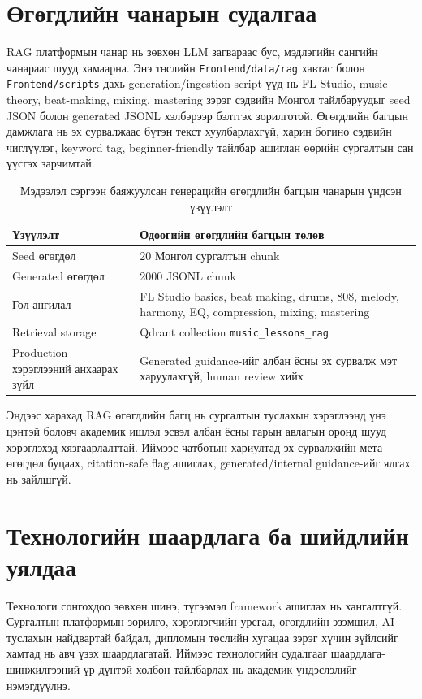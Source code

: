 \section{Өгөгдлийн чанарын судалгаа}
RAG платформын чанар нь зөвхөн LLM загвараас бус, мэдлэгийн сангийн чанараас шууд хамаарна. Энэ төслийн \texttt{Frontend/data/rag} хавтас болон \texttt{Frontend/scripts} дахь generation/ingestion script-үүд нь FL Studio, music theory, beat-making, mixing, mastering зэрэг сэдвийн Монгол тайлбаруудыг seed JSON болон generated JSONL хэлбэрээр бэлтгэх зорилготой. Өгөгдлийн багцын дамжлага нь эх сурвалжаас бүтэн текст хуулбарлахгүй, харин богино сэдвийн чиглүүлэг, keyword tag, beginner-friendly тайлбар ашиглан өөрийн сургалтын сан үүсгэх зарчимтай.

\begin{table}[htbp]
  \centering
  \begin{tabular}{|p{}|p{}|}
    \hline
    \textbf{Үзүүлэлт} & \textbf{Одоогийн өгөгдлийн багцын төлөв} \\ \hline
    Seed өгөгдөл & 20 Монгол сургалтын chunk \\ \hline
    Generated өгөгдөл & 2000 JSONL chunk \\ \hline
    Гол ангилал & FL Studio basics, beat making, drums, 808, melody, harmony, EQ, compression, mixing, mastering \\ \hline
    Retrieval storage & Qdrant collection \texttt{music\_lessons\_rag} \\ \hline
    Production хэрэглээний анхаарах зүйл & Generated guidance-ийг албан ёсны эх сурвалж мэт харуулахгүй, human review хийх \\ \hline
  \end{tabular}
  \caption{Мэдээлэл сэргээн баяжуулсан генерацийн өгөгдлийн багцын чанарын үндсэн үзүүлэлт}
  \label{tab:rag-dataset-summary}
\end{table}

Эндээс харахад RAG өгөгдлийн багц нь сургалтын туслахын хэрэглээнд үнэ цэнтэй боловч академик ишлэл эсвэл албан ёсны гарын авлагын оронд шууд хэрэглэхэд хязгаарлалттай. Иймээс чатботын хариултад эх сурвалжийн мета өгөгдөл буцаах, citation-safe flag ашиглах, generated/internal guidance-ийг ялгах нь зайлшгүй.

\section{Технологийн шаардлага ба шийдлийн уялдаа}
Технологи сонгохдоо зөвхөн шинэ, түгээмэл framework ашиглах нь хангалтгүй. Сургалтын платформын зорилго, хэрэглэгчийн урсгал, өгөгдлийн эзэмшил, AI туслахын найдвартай байдал, дипломын төслийн хугацаа зэрэг хүчин зүйлсийг хамтад нь авч үзэх шаардлагатай. Иймээс технологийн судалгааг шаардлага-шинжилгээний үр дүнтэй холбон тайлбарлах нь академик үндэслэлийг нэмэгдүүлнэ.

